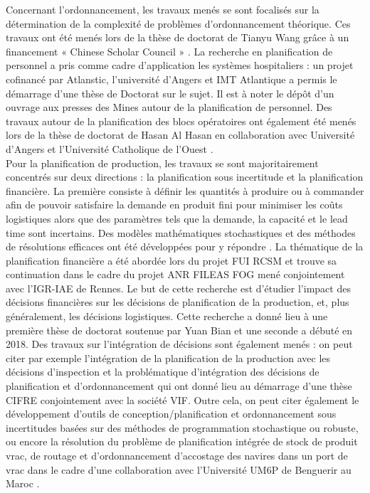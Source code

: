 Concernant l’ordonnancement, les travaux menés se sont focalisés sur la détermination de la complexité de problèmes d’ordonnancement théorique. Ces travaux ont été menés lors de la thèse de doctorat de Tianyu Wang grâce à un financement « Chinese Scholar Council » \cite{wang:hal-02062182,wang:hal-02062178}.  La recherche en planification de personnel a pris comme cadre d’application les systèmes hospitaliers : un projet cofinancé par Atlanstic, l’université d’Angers et IMT Atlantique a permis le démarrage d’une thèse de Doctorat sur le sujet. Il est à noter le dépôt d’un ouvrage aux presses des Mines autour de la planification de personnel. Des travaux autour de la planification des blocs opératoires ont également été menés lors de la thèse de doctorat de Hasan Al Hasan en collaboration avec Université d’Angers et l’Université Catholique de l’Ouest \cite{alhasan:hal-01875359}. \\

Pour la planification de production, les travaux se sont majoritairement concentrés sur deux directions : la planification sous incertitude et la planification financière. La première consiste à définir les quantités à produire ou à commander afin de pouvoir satisfaire la demande en produit fini pour minimiser les coûts logistiques alors que des paramètres tels que la demande, la capacité et le lead time sont incertains. Des modèles mathématiques stochastiques et des méthodes de résolutions efficaces ont été développées pour y répondre \cite{benammar:hal-02415341,benammar:hal-02435962,benammar:hal-01961194,BENAMMAR201839,Thevenin2020,borodin:hal-01313213}. La thématique de la planification financière a été abordée lors du projet FUI RCSM et trouve sa continuation dans le cadre du projet ANR FILEAS FOG mené conjointement avec l’IGR-IAE de Rennes. Le but de cette recherche est d'étudier l’impact des décisions financières sur les décisions de planification de la production, et, plus généralement, les décisions logistiques.  Cette recherche a donné lieu à une première thèse de doctorat soutenue par Yuan Bian \cite{bian:hal-02190123,bian:halshs-01683781} et une seconde a débuté en 2018.  Des travaux sur l’intégration de décisions sont également menés : on peut citer par exemple l’intégration de la planification de la production avec les décisions d’inspection \cite{bettayeb:hal-01689377} et la problématique d’intégration des décisions de planification et d’ordonnancement qui ont donné lieu au démarrage d’une thèse CIFRE conjointement avec la société VIF. Outre cela, on peut citer également le développement d’outils de conception/planification et ordonnancement sous incertitudes basées sur des méthodes de programmation stochastique ou robuste, ou encore la résolution du problème de planification intégrée de stock de produit vrac, de routage et d’ordonnancement d’accostage des navires dans un port de vrac dans le cadre d'une collaboration avec l’Université UM6P de Benguerir au Maroc \cite{Najid2020}. \\

